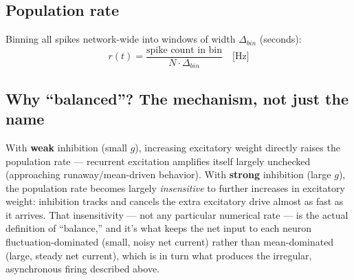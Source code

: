 \documentclass[11pt,a4paper]{article}
\begin{document}
\subsection{Population rate}
Binning all spikes network-wide into windows of width $\Delta_{bin}$ (seconds):
$$r(t) = \frac{\text{spike count in bin}}{N \cdot \Delta_{bin}} \quad \text{[Hz]}$$

\subsection{Why ``balanced''? The mechanism, not just the name}
\begin{keybox}
With \textbf{weak} inhibition (small $g$), increasing excitatory weight directly raises the population rate — recurrent excitation amplifies itself largely unchecked (approaching runaway/mean-driven behavior). With \textbf{strong} inhibition (large $g$), the population rate becomes largely \emph{insensitive} to further increases in excitatory weight: inhibition tracks and cancels the extra excitatory drive almost as fast as it arrives. That insensitivity — not any particular numerical rate — is the actual definition of ``balance,'' and it's what keeps the net input to each neuron fluctuation-dominated (small, noisy net current) rather than mean-dominated (large, steady net current), which is in turn what produces the irregular, asynchronous firing described above.
\end{keybox}

\newpage
\end{document}
